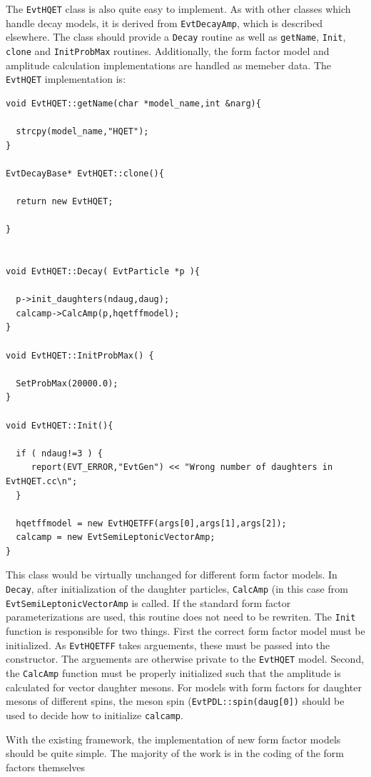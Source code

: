 \noindent The {\tt EvtHQET} class is also quite easy to
implement.  As with other classes which handle decay
models, it is derived from {\tt EvtDecayAmp}, which
is described elsewhere.  The class
should provide a {\tt Decay} routine as well as 
{\tt getName}, {\tt Init}, {\tt clone} 
and {\tt InitProbMax} routines.  Additionally,
the form factor model and amplitude calculation 
implementations are handled as memeber data.  The
{\tt EvtHQET} implementation is:
\begin{verbatim}
void EvtHQET::getName(char *model_name,int &narg){

  strcpy(model_name,"HQET");
}

EvtDecayBase* EvtHQET::clone(){

  return new EvtHQET;

}


void EvtHQET::Decay( EvtParticle *p ){

  p->init_daughters(ndaug,daug);
  calcamp->CalcAmp(p,hqetffmodel);
}

void EvtHQET::InitProbMax() {

  SetProbMax(20000.0);
}

void EvtHQET::Init(){

  if ( ndaug!=3 ) {
     report(EVT_ERROR,"EvtGen") << "Wrong number of daughters in EvtHQET.cc\n";
  }

  hqetffmodel = new EvtHQETFF(args[0],args[1],args[2]);
  calcamp = new EvtSemiLeptonicVectorAmp;
}
\end{verbatim}
This class would be virtually unchanged for different
form factor models.  In {\tt Decay}, after initialization
of the daughter particles, {\tt CalcAmp} (in this case
from {\tt EvtSemiLeptonicVectorAmp} is called.  If the
standard form factor parameterizations are used, this
routine does not need to be rewriten.  The {\tt Init}
function is responsible for two things.  First the correct
form factor model must be initialized.  As {\tt EvtHQETFF}
takes arguements, these must be passed into
the constructor.  The arguements are otherwise private to the
{\tt EvtHQET} model.  Second, the {\tt CalcAmp} function
must be properly initialized such that the amplitude
is calculated for vector daughter mesons.  For models with form
factors for daughter mesons of different spins, the meson
spin ({\tt EvtPDL::spin(daug[0])} should be used to decide 
how to initialize {\tt calcamp}.

\noindent With the existing framework, the implementation of
new form factor models should be quite simple.  The majority of
the work is in the coding of the form factors themselves

